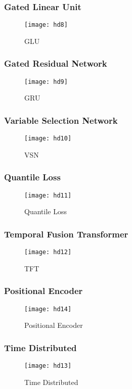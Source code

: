 \documentclass{article}
\begin{document}
\subsubsection{Gated Linear Unit}
\begin{figure}[H]
    \centering
    \texttt{[image: hd8]}
    \caption{GLU}
\end{figure}
\subsubsection{Gated Residual Network}
\begin{figure}[H]
    \centering
    \texttt{[image: hd9]}
    \caption{GRU}
\end{figure}
\subsubsection{Variable Selection Network}
\begin{figure}[H]
    \centering
    \texttt{[image: hd10]}
    \caption{VSN}
\end{figure}
\subsubsection{Quantile Loss}
\begin{figure}[H]
    \centering
    \texttt{[image: hd11]}
    \caption{Quantile Loss}
\end{figure}
\subsubsection{Temporal Fusion Transformer}
\begin{figure}[H]
    \centering
    \texttt{[image: hd12]}
    \caption{TFT}
\end{figure}
\clearpage
\subsubsection{Positional Encoder}
\begin{figure}[H]
    \centering
    \texttt{[image: hd14]}
    \caption{Positional Encoder}
\end{figure}
\subsubsection{Time Distributed}
\begin{figure}[H]
    \centering
    \texttt{[image: hd13]}
    \caption{Time Distributed}
\end{figure}
\end{document}
